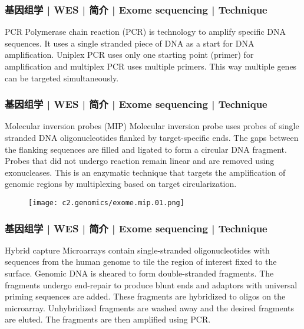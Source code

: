 \begin{frame}
  \frametitle{基因组学 | WES | 简介 | Exome sequencing | Technique}
  \begin{block}{PCR}
    Polymerase chain reaction (PCR) is technology to amplify specific DNA sequences. It uses a single stranded piece of DNA as a start for DNA amplification. Uniplex PCR uses only one starting point (primer) for amplification and multiplex PCR uses multiple primers. This way multiple genes can be targeted simultaneously.
  \end{block}
\end{frame}

\begin{frame}
  \frametitle{基因组学 | WES | 简介 | Exome sequencing | Technique}
  \begin{block}{Molecular inversion probes (MIP)}
    Molecular inversion probe uses probes of single stranded DNA oligonucleotides flanked by target-specific ends. The gaps between the flanking sequences are filled and ligated to form a circular DNA fragment. Probes that did not undergo reaction remain linear and are removed using exonucleases. This is an enzymatic technique that targets the amplification of genomic regions by multiplexing based on target circularization.
  \end{block}
  \begin{figure}
    \centering
    \texttt{[image: c2.genomics/exome.mip.01.png]}
  \end{figure}
\end{frame}

\begin{frame}
  \frametitle{基因组学 | WES | 简介 | Exome sequencing | Technique}
  \begin{block}{Hybrid capture}
    Microarrays contain single-stranded oligonucleotides with sequences from the human genome to tile the region of interest fixed to the surface. Genomic DNA is sheared to form double-stranded fragments. The fragments undergo end-repair to produce blunt ends and adaptors with universal priming sequences are added. These fragments are hybridized to oligos on the microarray. Unhybridized fragments are washed away and the desired fragments are eluted. The fragments are then amplified using PCR.
  \end{block}
\end{frame}

